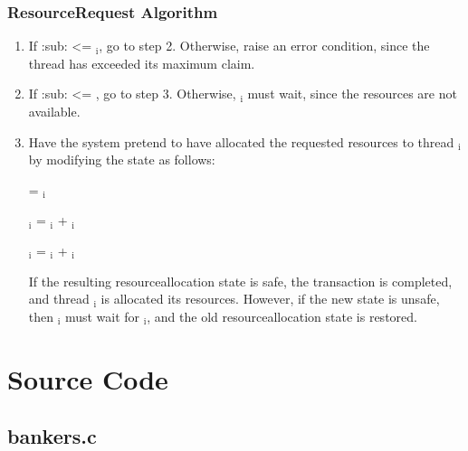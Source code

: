 \documentclass[letterpaper,10pt,english,openany,oneside]{sphinxmanual}
\begin{document}
\subsection{Resource\sphinxhyphen{}Request Algorithm}
\label{\detokenize{implementation:resource-request-algorithm}}\begin{enumerate}
%
\item {} 
If :sub:  \textless{}= $_{\text{i}}$, go to step 2. Otherwise, raise an error condition, since the thread has exceeded its maximum claim.

\item {} 
If :sub:  \textless{}= , go to step 3. Otherwise, $_{\text{i}}$ must wait, since the resources are not available.

\item {} 
Have the system pretend to have allocated the requested resources to thread $_{\text{i}}$ by modifying the state as follows:

 =  \sphinxhyphen{} $_{\text{i}}$

$_{\text{i}}$ = $_{\text{i}}$ + $_{\text{i}}$

$_{\text{i}}$ = $_{\text{i}}$ + $_{\text{i}}$

If the resulting resource\sphinxhyphen{}allocation state is safe, the transaction is completed, and thread $_{\text{i}}$ is allocated its resources. However, if the new state is unsafe, then $_{\text{i}}$ must wait for $_{\text{i}}$, and the old resource\sphinxhyphen{}allocation state is restored.

\end{enumerate}


\chapter{Source Code}
\label{\detokenize{source_code:source-code}}\label{\detokenize{source_code::doc}}

\section{bankers.c}
\label{\detokenize{source_code:bankers-c}}
\end{document}

